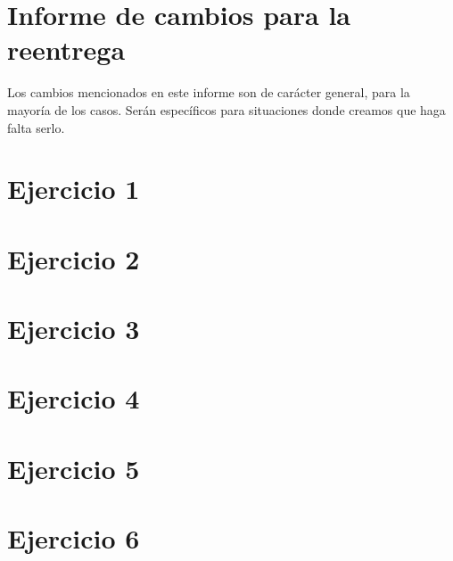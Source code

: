 \documentclass[10pt,a4paper]{article}
\begin{document}
\section{Informe de cambios para la reentrega}
Los cambios mencionados en este informe son de carácter general, para la mayoría de los casos. Serán específicos para situaciones donde creamos que haga falta serlo.
\section{Ejercicio 1}
\section{Ejercicio 2}
\section{Ejercicio 3}
\section{Ejercicio 4}
\section{Ejercicio 5}
\section{Ejercicio 6}
\end{document}
